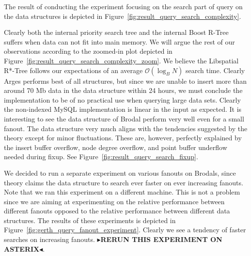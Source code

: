 \documentclass[twoside,11pt,openright]{report}
\newcommand{\todo}[1]{{\color[rgb]{.5,0,0}\textbf{$\blacktriangleright$#1$\blacktriangleleft$}}}
\begin{document}
The result of conducting the experiment focusing on the search part of query on the data structures is depicted in Figure~\ref{fig:result_query_search_complexity}.

Clearly both the internal priority search tree and the internal Boost R-Tree suffers when data can not fit into main memory. We will argue the rest of our observations according to the zoomed-in plot depicted in Figure~\ref{fig:result_query_search_complexity_zoom}. We believe the Libspatial R*-Tree follows our expectations of an average $\mathcal{O}(\log_B N)$ search time. Clearly Arges performs best of all structures, but since we are unable to insert more than around 70 Mb data in the data structure within 24 hours, we must conclude the implementation to be of no practical use when querying large data sets. Clearly the non-indexed MySQL implementation is linear in the input as expected. It is interesting to see the data structure of Brodal perform very well even for a small fanout. The data structure very much aligns with the tendencies suggested by the theory except for minor fluctuations. These are, however, perfectly explained by the insert buffer overflow, node degree overflow, and point buffer underflow needed during fixup. See Figure~\ref{fig:result_query_search_fixup}.

We decided to run a separate experiment on various fanouts on Brodals, since theory claims the data structure to search ever faster on ever increasing fanouts.
Note that we ran this experiment on a different machine. This is not a problem since we are aiming at experimenting on the relative performance between different fanouts opposed to the relative performance between different data structures. The results of these experiments is depicted in Figure~\ref{fig:gerth_query_fanout_experiment}.
Clearly we see a tendency of faster searches on increasing fanouts. \todo{RERUN THIS EXPERIMENT ON ASTERIX}.

\clearpage
\end{document}
